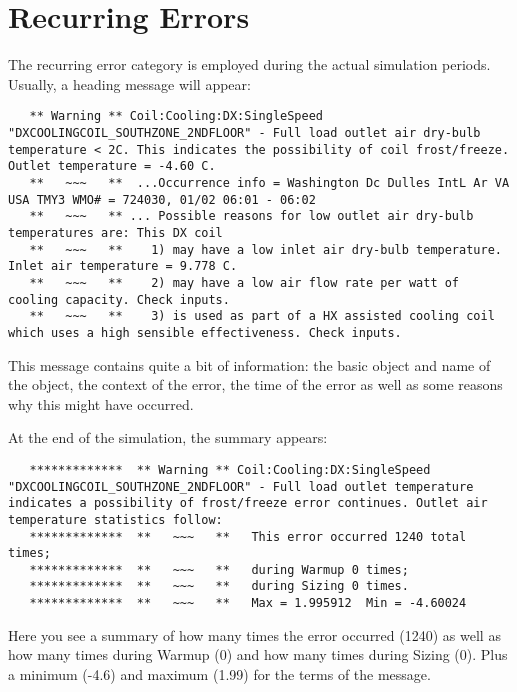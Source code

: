 \section{Recurring Errors}\label{recurring-errors}

The recurring error category is employed during the actual simulation periods. Usually, a heading message will appear:

\begin{lstlisting}
   ** Warning ** Coil:Cooling:DX:SingleSpeed "DXCOOLINGCOIL_SOUTHZONE_2NDFLOOR" - Full load outlet air dry-bulb temperature < 2C. This indicates the possibility of coil frost/freeze. Outlet temperature = -4.60 C.
   **   ~~~   **  ...Occurrence info = Washington Dc Dulles IntL Ar VA USA TMY3 WMO# = 724030, 01/02 06:01 - 06:02
   **   ~~~   ** ... Possible reasons for low outlet air dry-bulb temperatures are: This DX coil
   **   ~~~   **    1) may have a low inlet air dry-bulb temperature. Inlet air temperature = 9.778 C.
   **   ~~~   **    2) may have a low air flow rate per watt of cooling capacity. Check inputs.
   **   ~~~   **    3) is used as part of a HX assisted cooling coil which uses a high sensible effectiveness. Check inputs.
\end{lstlisting}

This message contains quite a bit of information: the basic object and name of the object, the context of the error, the time of the error as well as some reasons why this might have occurred.

At the end of the simulation, the summary appears:

\begin{lstlisting}
   *************  ** Warning ** Coil:Cooling:DX:SingleSpeed "DXCOOLINGCOIL_SOUTHZONE_2NDFLOOR" - Full load outlet temperature indicates a possibility of frost/freeze error continues. Outlet air temperature statistics follow:
   *************  **   ~~~   **   This error occurred 1240 total times;
   *************  **   ~~~   **   during Warmup 0 times;
   *************  **   ~~~   **   during Sizing 0 times.
   *************  **   ~~~   **   Max = 1.995912  Min = -4.60024
\end{lstlisting}

Here you see a summary of how many times the error occurred (1240) as well as how many times during Warmup (0) and how many times during Sizing (0). Plus a minimum (-4.6) and maximum (1.99) for the terms of the message.
